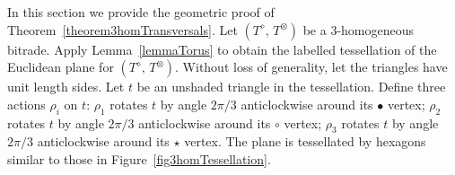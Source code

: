 \documentclass[amstags,fleqn,reqno]{article}
\theoremstyle{plain}
\theoremstyle{definition}
\newcommand{\opa}{\diamond}
\newcommand{\opb}{\otimes}
\newcommand{\blackvertex}{\bullet}
\newcommand{\whitevertex}{\circ}
\newcommand{\starvertex}{\star}
\begin{document}
In this section we provide the geometric proof of
Theorem~\ref{theorem3homTransversals}. Let $(T^{\opa},\, T^{\opb})$ be a
$3$-homogeneous bitrade. Apply Lemma~\ref{lemmaTorus} to obtain the
labelled tessellation of the Euclidean plane for $(T^{\opa},\, T^{\opb})$.
Without loss of generality, let the triangles have unit length sides.
Let $t$ be an unshaded triangle in the tessellation.
Define three actions $\rho_i$ on $t$:
$\rho_1$ rotates $t$ by angle $2 \pi/3$ anticlockwise around its
$\blackvertex$ vertex;
$\rho_2$ rotates $t$ by angle $2 \pi/3$ anticlockwise around its
$\whitevertex$ vertex;
$\rho_3$ rotates $t$ by angle $2 \pi/3$ anticlockwise around its
$\starvertex$ vertex.
The plane is tessellated by hexagons similar to those in 
Figure~\ref{fig3homTessellation}.
\end{document}
